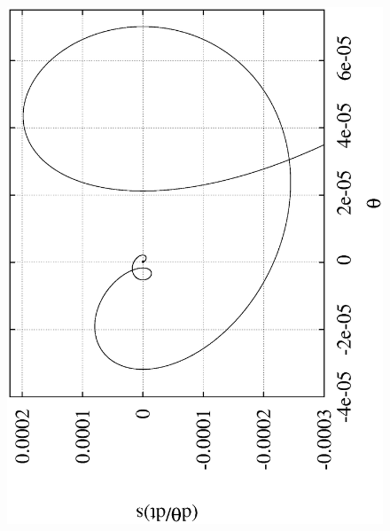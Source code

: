 \documentclass[10pt,a4paper]{article}
\begin{document}
\begin{figure}[h!]
\begin{center}
\includegraphics[scale = 0.3, angle =-90]{frac3.eps}

\end{center}
\end{figure}
\end{document}
